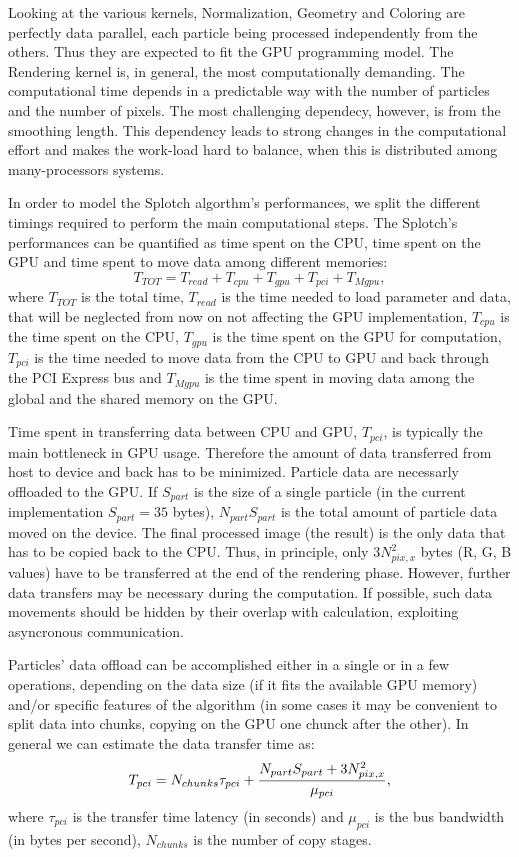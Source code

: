 \documentclass[11pt]{article}
\begin{document}
Looking at the various kernels, Normalization, Geometry and Coloring are  
perfectly data parallel, each particle being processed independently from the others.
Thus they are expected to fit the GPU programming model. 
The Rendering kernel is, in general, the most computationally demanding. 
The computational time depends in a predictable way with the number of particles and the number 
of pixels. The most challenging dependecy, however, is from the smoothing length. 
This dependency leads to strong changes in the computational effort and makes
the work-load hard to balance, when this is distributed among many-processors
systems.

In order to model the Splotch algorthm's performances, we split the different timings
required to perform the main computational steps. 
The Splotch's performances can be quantified as time spent on the CPU, time spent on the GPU
and time spent to move data among different memories:
\begin{equation}\label{Ts}
T_{TOT} = T_{read} + T_{cpu} + T_{gpu} + T_{pci} + T_{Mgpu},
\end{equation}
where $T_{TOT}$ is the total time, $T_{read}$ is the time needed to load parameter and data, that 
will be neglected from now on not affecting the GPU implementation, 
$T_{cpu}$ is the time spent on the CPU, $T_{gpu}$ is the time
spent on the GPU for computation, $T_{pci}$ is the time needed to move data from
the CPU to GPU and back through the PCI Express bus and $T_{Mgpu}$ is the time 
spent in moving data among the global and the shared memory on the GPU.

Time spent in transferring data
between CPU and GPU, $T_{pci}$, is typically the main 
bottleneck in GPU usage. Therefore the amount of data transferred from host
to device and back has to be minimized. 
Particle data are necessarly offloaded to the GPU. If $S_{part}$ is the
size of a single particle (in the current implementation $S_{part}=35$ bytes),
$N_{part} S_{part}$ is the total amount of particle data moved on the device.
The final processed image (the result) is the only data that has to be copied back to
the CPU. Thus, in principle, only $3 N_{pix,x}^2$ bytes (R, G, B values) have to be transferred at
the end of the rendering phase. However, further data transfers may be necessary
during the computation. If possible, such data movements should be hidden
by their overlap with calculation, exploiting asyncronous communication.

Particles' data offload can be accomplished either in a single or in a few operations, 
depending on the data size (if it fits the available GPU memory) and/or
specific features of the algorithm (in some cases it may be convenient to
split data into chunks, copying on the GPU one chunck after the other).
In general we can estimate the data transfer time as:
\begin{equation}\label{pci}
T_{pci} =  N_{chunks} \tau_{pci} + {N_{part} S_{part} + 3 N_{pix,x}^2 \over 
\mu_{pci}},
\end{equation}
where $\tau_{pci}$ is the transfer time latency (in seconds) and $\mu_{pci}$ is the
bus bandwidth (in bytes per second), $N_{chunks}$ is the number 
of copy stages. 
\end{document}
